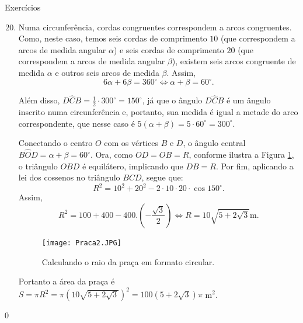 \begin{answer}{Exercícios}
{\exerciselist
\begin{enumerate}\setcounter{enumi}{19}
\item Numa circunferência, cordas congruentes correspondem a arcos congruentes. Como, neste caso, temos seis cordas de comprimento $10$ (que correspondem a arcos de medida angular $\alpha$) e seis cordas de comprimento $20$ (que correspondem a arcos de medida angular $\beta$), existem seis arcos congruente de medida $\alpha$ e outros seis arcos de medida $\beta$. Assim,
    $$6\alpha+6\beta=360^\circ \iff \alpha+\beta=60^\circ.$$
   
    Além disso, $D\hat{C}B=\frac{1}{2}\cdot 300^\circ=150^\circ$, já que o ângulo $D\hat{C}B$ é um ângulo inscrito numa circunferência e, portanto, sua medida é igual a metade do arco correspondente, que nesse caso é $5(\alpha+\beta)=5\cdot60^\circ=300^\circ$.
    
    Conectando o centro $O$ com os vértices $B$ e $D$, o ângulo central $B\hat{O}D=\alpha+\beta=60^\circ$. Ora, como $OD=OB=R$, conforme ilustra a Figura \ref{praca2}, o triângulo $OBD$ é equilátero, implicando que $DB=R$. Por fim, aplicando a lei dos cossenos no triângulo $BCD$, segue que:
    $$R^2=10^2+20^2-2\cdot10\cdot20\cdot\cos150^\circ.$$
    Assim, 
    $$R^2=100+400-400.\left(-\frac{\sqrt{3}}{2}\right) \iff R=10\sqrt{5+2\sqrt{3}} \text{m}.$$
     \begin{figure}[H]
    \centering
    \texttt{[image: Praca2.JPG]}
    \caption{Calculando o raio da praça em formato circular.}
    \label{praca2}
    \end{figure}
    
    Portanto a área da praça é $S=\pi R^2=\pi (10\sqrt{5+2\sqrt{3}})^2=100(5+2\sqrt{3})\pi$ m$^2$.
\end{enumerate}
}{0}
\end{answer}

